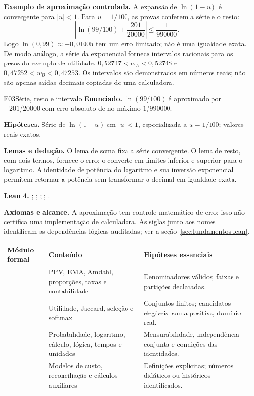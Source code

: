\begin{resultado}
\textbf{Exemplo de aproximação controlada.} A expansão de $\ln(1-u)$ é
convergente para $|u|<1$. Para $u=1/100$, as provas conferem a série e o resto:
\[
 \left|\ln(99/100)+\frac{201}{20000}\right|\leq\frac{1}{990000}.
\]
Logo $\ln(0{,}99)\approx-0{,}01005$ tem um erro limitado; não é uma igualdade
exata. De modo análogo, a série da exponencial fornece intervalos racionais
para os pesos do exemplo de utilidade:
$0{,}52747<w_A<0{,}52748$ e $0{,}47252<w_B<0{,}47253$.
Os intervalos são demonstrados em números reais; não são apenas saídas
decimais copiadas de uma calculadora.
\end{resultado}
\begin{formalizacao}{F03}{Série, resto e intervalo}
\textbf{Enunciado.} $\ln(99/100)$ é aproximado por $-201/20000$ com erro absoluto de no máximo $1/990000$.

\textbf{Hipóteses.} Série de $\ln(1-u)$ em $|u|<1$, especializada a $u=1/100$; valores reais exatos.

\textbf{Lemas e dedução.} O lema de soma fixa a série convergente. O lema de resto, com dois termos, fornece o erro;  o converte em limites inferior e superior para o logaritmo. A identidade de potência do logaritmo e sua inversão exponencial permitem retornar à potência sem transformar o decimal em igualdade exata.

\textbf{Lean 4.} ; ; ; ; .

\textbf{Axiomas e alcance.} A aproximação tem controle matemático de erro; isso não certifica uma implementação de calculadora. As siglas junto aos nomes identificam as dependências lógicas auditadas; ver a seção~\ref{sec:fundamentos-lean}.
\end{formalizacao}


\begin{center}
\small
\begin{tabularx}{\linewidth}{p{2.6cm}YY}
\toprule Módulo formal & Conteúdo & Hipóteses essenciais \\ \midrule
{} & PPV, EMA, Amdahl, proporções, taxas e contabilidade & Denominadores válidos; faixas e partições declaradas. \\
 & Utilidade, Jaccard, seleção e softmax & Conjuntos finitos; candidatos elegíveis; soma positiva; domínio real. \\
 & Probabilidade, logaritmo, cálculo, lógica, tempos e unidades & Mensurabilidade, independência conjunta e condições das identidades. \\
 & Modelos de custo, reconciliação e cálculos auxiliares & Definições explícitas; números didáticos ou históricos identificados. \\
\bottomrule
\end{tabularx}
\end{center}

